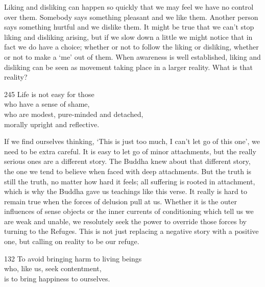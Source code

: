 \begin{dhpRefl}
  Liking and disliking can happen so quickly that we may feel we have no control
  over them. Somebody says something pleasant and we like them. Another person
  says something hurtful and we dislike them. It might be true that we can't
  stop liking and disliking arising, but if we slow down a little we might
  notice that in fact we do have a choice; whether or not to follow the liking
  or disliking, whether or not to make a ‘me’ out of them. When awareness is
  well established, liking and disliking can be seen as movement taking place in
  a larger reality. What is that reality?
\end{dhpRefl}


\begin{dhpVerse}{245}
\label{dhp-245}
Life is not easy for those\\
who have a sense of shame,\\
who are modest, pure-minded and detached,\\
morally upright and reflective.
\end{dhpVerse}

\begin{dhpRefl}
  If we find ourselves thinking, `This is just too much, I can't let go of this
  one', we need to be extra careful. It is easy to let go of minor attachments,
  but the really serious ones are a different story. The Buddha knew about that
  different story, the one we tend to believe when faced with deep attachments.
  But the truth is still the truth, no matter how hard it feels; all suffering
  is rooted in attachment, which is why the Buddha gave us teachings like this
  verse. It really is hard to remain true when the forces of delusion pull at
  us. Whether it is the outer influences of sense objects or the inner currents
  of conditioning which tell us we are weak and unable, we resolutely seek the
  power to override those forces by turning to the Refuges. This is not just
  replacing a negative story with a positive one, but calling on reality to be
  our refuge.
\end{dhpRefl}


\begin{dhpVerse}{132}
\label{dhp-132}
To avoid bringing harm to living beings\\
who, like us, seek contentment,\\
is to bring happiness to ourselves.
\end{dhpVerse}

